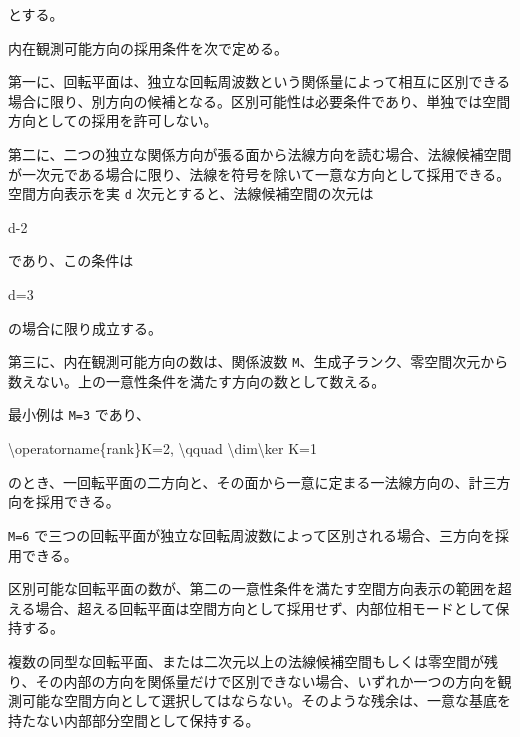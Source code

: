 \documentclass[
  a4paper,
]{ltjsarticle}
\newenvironment{Shaded}{}{}
\newcommand{\NormalTok}[1]{#1}
\begin{document}
とする。

内在観測可能方向の採用条件を次で定める。

第一に、回転平面は、独立な回転周波数という関係量によって相互に区別できる場合に限り、別方向の候補となる。区別可能性は必要条件であり、単独では空間方向としての採用を許可しない。

第二に、二つの独立な関係方向が張る面から法線方向を読む場合、法線候補空間が一次元である場合に限り、法線を符号を除いて一意な方向として採用できる。空間方向表示を実
\texttt{d} 次元とすると、法線候補空間の次元は

\begin{Shaded}
\begin{Highlighting}[]
\NormalTok{d{-}2}
\end{Highlighting}
\end{Shaded}

であり、この条件は

\begin{Shaded}
\begin{Highlighting}[]
\NormalTok{d=3}
\end{Highlighting}
\end{Shaded}

の場合に限り成立する。

第三に、内在観測可能方向の数は、関係波数
\texttt{M}、生成子ランク、零空間次元から数えない。上の一意性条件を満たす方向の数として数える。

最小例は \texttt{M=3} であり、

\begin{Shaded}
\begin{Highlighting}[]
\NormalTok{\textbackslash{}operatorname\{rank\}K=2,}
\NormalTok{\textbackslash{}qquad}
\NormalTok{\textbackslash{}dim\textbackslash{}ker K=1}
\end{Highlighting}
\end{Shaded}

のとき、一回転平面の二方向と、その面から一意に定まる一法線方向の、計三方向を採用できる。

\texttt{M=6}
で三つの回転平面が独立な回転周波数によって区別される場合、三方向を採用できる。

区別可能な回転平面の数が、第二の一意性条件を満たす空間方向表示の範囲を超える場合、超える回転平面は空間方向として採用せず、内部位相モードとして保持する。

複数の同型な回転平面、または二次元以上の法線候補空間もしくは零空間が残り、その内部の方向を関係量だけで区別できない場合、いずれか一つの方向を観測可能な空間方向として選択してはならない。そのような残余は、一意な基底を持たない内部部分空間として保持する。
\end{document}
